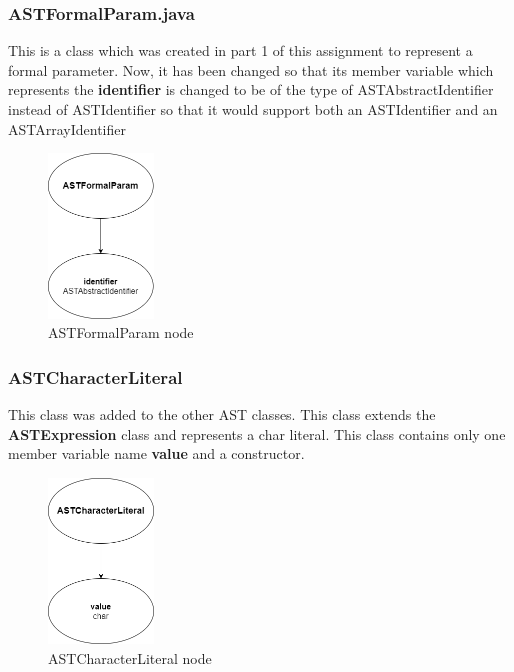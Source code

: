 \documentclass{article}
\begin{document}
						\subsubsection{ASTFormalParam.java}
					
					This is a class which was created in part 1 of this assignment to represent a formal parameter. Now, it has been changed so that its member variable which represents the \textbf{identifier} is changed to be of the type of ASTAbstractIdentifier instead of ASTIdentifier so that it would support both an ASTIdentifier and an ASTArrayIdentifier
					
					\begin{figure}[H]
					\centering
			 			\includegraphics[width=0.25\textwidth]{astformalparam2.png}
			  			\caption{ASTFormalParam node}
			  			\label{fig:astformalparam}
					\end{figure}
					
				\subsubsection{ASTCharacterLiteral}
				
				This class was added to the other AST classes. This class extends the \textbf{ASTExpression} class and represents a char literal. This class contains only one member variable name \textbf{value} and a constructor.
				
				\begin{figure}[H]
					\centering
			 			\includegraphics[width=0.25\textwidth]{ASTCharLiteral.png}
			  			\caption{ASTCharacterLiteral node}
			  			\label{fig:astcharlit}
					\end{figure}
				
				
				
				
				
				
				
				
		
		
		\nocite{*}

			
		
			
					
			
\end{document}
